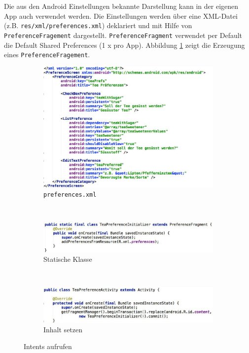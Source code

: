 Die aus den Android Einstellungen bekannte Darstellung kann in der eigenen App auch verwendet werden. Die Einstellungen werden über eine XML-Datei (z.B. \texttt{res/xml/preferences.xml}) deklariert und mit Hilfe von \texttt{PreferenceFragement} dargestellt. \texttt{PreferenceFragment} verwendet per Default die Default Shared Preferences (1 x pro App). Abbildung \ref{fig:preference-fragment} zeigt die Erzeugung eines \texttt{PreferenceFragement}.
\begin{figure}
	\centering
	\begin{subfigure}[b]{0.48\textwidth}
		\includegraphics[width=\textwidth]{fig/preference-fragment-xml}
		\caption{\texttt{preferences.xml}}
	\end{subfigure}
	~
	\begin{subfigure}[b]{0.48\textwidth}
		\includegraphics[width=\textwidth]{fig/preference-fragment-static}
		\caption{Statische Klasse}
	\end{subfigure}
	~
	\begin{subfigure}[b]{0.48\textwidth}
		\includegraphics[width=\textwidth]{fig/preference-fragment-activity}
		\caption{Inhalt setzen}
	\end{subfigure}
	\caption{Intents aufrufen}
	\label{fig:preference-fragment}
\end{figure}

